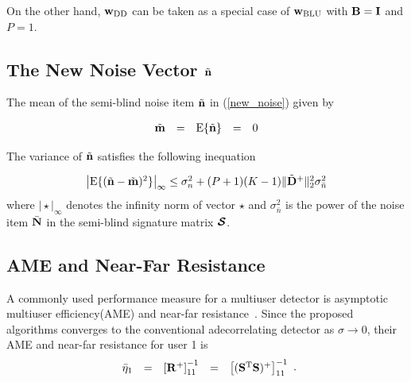 \documentclass[a4paper,10pt,fleqn, twocolumn]{IEEETran}
\newcommand{\bm}{{\bf m}}
\newcommand{\bn}{{\bf n}}
\newcommand{\bw}{{\bf w}}
\newcommand{\bN}{{\bf N}}
\newcommand{\bS}{{\bf S}}
\newcommand{\bD}{{\bf D}}
\newcommand{\bI}{{\bf I}}
\newcommand{\bR}{{\bf R}}
\newcommand{\bB}{{\bf B}}
\newcommand{\bcS}{{\mbox {\boldmath ${\cal S}$}}}
\begin{document}
\noindent On the other hand, $\bw_{\rm DD}$ can be taken as a
special case of $\bw_{\rm BLU}$ with $\bB =\bI$ and $P=1$.

\subsection{The New Noise Vector $\tilde{\bn}$}

The mean of the semi-blind noise item $\tilde{\bn}$ in
(\ref{new_noise}) given by

\begin{equation}
\begin{array}{rcccl}
\tilde{\bm}&=&{\rm E}\{\tilde{\bn}\}&=&0
\end{array}
\end{equation}

\noindent The variance of $\tilde{\bn}$ satisfies the following
inequation

\begin{equation}\hspace{-0.0in}
\begin{array}{l}
\bigl|{\rm
E}\{(\tilde{\bn}-\tilde{\bm})^2\}\bigr|_{\infty}\leq\sigma_n^2+(P+1)(K-1)\|\tilde{\bD}^+\|_2^2\sigma_{\bar{n}}^2
\end{array} \label{noise_mean}
\end{equation}
\noindent where $\bigl|\star\bigr|_{\infty}$ denotes the infinity
norm of vector $\star$ and $\sigma_{\bar{n}}^2$ is the power of
the noise item $\bar{\bN}$ in the semi-blind signature matrix
$\bcS$.

\subsection{AME and Near-Far Resistance}
A commonly used performance measure for a multiuser detector is
asymptotic multiuser efficiency(AME) and near-far
resistance~\cite{Verd98}. Since the proposed algorithms converges
to the conventional adecorrelating detector as $\sigma\rightarrow
0$, their AME and near-far resistance for user 1 is
\begin{equation}
\begin{array}{rcccl}
\bar{\eta}_1&=&\left[\bR^{+}\right]_{11}^{-1}&=&\left[(\bS^{\rm
T}\bS)^{+}\right]_{11}^{-1}
\end{array}.
\end{equation}
\end{document}
